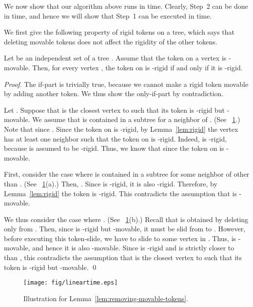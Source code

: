 \documentclass{llncs}
\newcounter{one}
\begin{document}
	We now show that our algorithm above runs in  time. 
	Clearly, Step~2 can be done in  time, and hence we will show that Step~1 can be executed in  time.
\smallskip
	
	We first give the following property of rigid tokens on a tree, which says that deleting movable tokens does not affect the rigidity of the other tokens.
	\begin{lemma} \label{lem:removing-movable-tokens}
	Let  be an independent set of a tree .
	Assume that the token on a vertex  is -movable.
	Then, for every vertex , the token on  is -rigid if and only if it is -rigid.
	\end{lemma}
	\begin{proof}
	The if-part is trivially true, because we cannot make a rigid token movable by adding another token.
	We thus show the only-if-part by contradiction.

	Let .
	Suppose that  is the closest vertex to  such that its token is -rigid but -movable.
	We assume that  is contained in a subtree  for a neighbor  of . 
(See \figurename~\ref{fig:removing_movable_tokens}.)
	Note that  since .
	Since the token  on  is -rigid, by Lemma~\ref{lem:rigid} the vertex  has at least one neighbor  such that the token  on  is -rigid.
	Indeed,  is -rigid, because  is assumed to be -rigid.
	Thus, we know that  since the token  on  is -movable.

	First, consider the case where  is contained in a subtree  for some neighbor  of  other than . 
(See \figurename~\ref{fig:removing_movable_tokens}(a).)
	Then, .
	Since  is -rigid, it is also -rigid.
	Therefore, by Lemma~\ref{lem:rigid} the token  is -rigid.
	This contradicts the assumption that  is -movable.


	We thus consider the case where . 
(See \figurename~\ref{fig:removing_movable_tokens}(b).)
	Recall that  is obtained by deleting only  from . 
	Then, since  is -rigid but -movable, it must be slid from  to . 
	However, before executing this token-slide, we have to slide  to some vertex in .
	Thus,  is -movable, and hence it is also -movable.
	Since  is -rigid and  is strictly closer to  than , this contradicts the assumption that  is the closest vertex to  such that its token is -rigid but -movable.
\qed
\end{proof}

\begin{figure}[t]
\begin{center}
	\texttt{[image: fig/lineartime.eps]}
	\end{center}
	\vspace{-1em}
	\caption{Illustration for Lemma~\ref{lem:removing-movable-tokens}.}
	\label{fig:removing_movable_tokens}
\end{figure}
\end{document}
